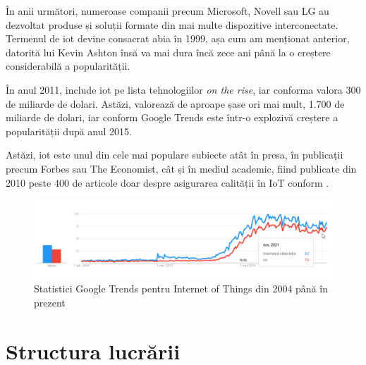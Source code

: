 

În anii următori, numeroase companii precum Microsoft, Novell sau LG au dezvoltat produse și soluții formate din mai multe dispozitive interconectate. Termenul de \acrlong{iot} devine consacrat abia în 1999, așa cum am menționat anterior, datorită lui Kevin Ashton însă va mai dura încă zece ani până la o creștere considerabilă a popularității.

În anul 2011, \cite{Gartner2011} include \acrlong{iot} pe lista tehnologiilor \textit{on the rise}, iar conforma \cite{statistaIot} valora 300 de miliarde de dolari. Astăzi, valorează de aproape șase ori mai mult, 1.700 de miliarde de dolari, iar conform Google Trends este într-o explozivă creștere a popularității după anul 2015.

Astăzi, \acrlong{iot} este unul din cele mai populare subiecte atât în presa, în publicații precum Forbes sau The Economist, cât și în mediul academic, fiind publicate din 2010 peste 400 de articole doar despre asigurarea calității în IoT conform \cite{Ahmed2019}.


\begin{figure}[h]
\caption{Statistici Google Trends pentru Internet of Things din 2004 până în prezent}
\centering
\includegraphics[width=\textwidth]{images/trends_iot.png}
\end{figure}


\section{Structura lucrării}

